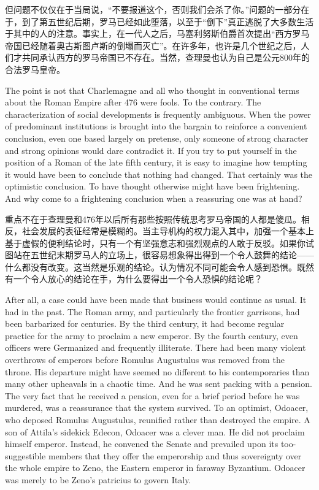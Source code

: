 \begin{Parallel}{97mm}{72mm}
  \ParallelRText
  {但问题不仅仅在于当局说，“不要报道这个，否则我们会杀了你。”问题的一部分在于，到了第五世纪后期，罗马已经如此堕落，以至于“倒下”真正逃脱了大多数生活于其中的人的注意。事实上，在一代人之后，马塞利努斯伯爵首次提出“西方罗马帝国已经随着奥古斯图卢斯的倒塌而灭亡”。在许多年，也许是几个世纪之后，人们才共同承认西方的罗马帝国已不存在。当然，查理曼也认为自己是公元800年的合法罗马皇帝。}
  \ParallelPar


  \ParallelLText
  {The point is not that Charlemagne and all who thought in conventional terms about the Roman Empire after 476 were fools. To the contrary. The characterization of social developments is frequently ambiguous. When the power of predominant institutions is brought into the bargain to reinforce a convenient conclusion, even one based largely on pretense, only someone of strong character and strong opinions would dare contradict it. If you try to put yourself in the position of a Roman of the late fifth century, it is easy to imagine how tempting it would have been to conclude that nothing had changed. That certainly was the optimistic conclusion. To have thought otherwise might have been frightening. And why come to a frightening conclusion when a reassuring one was at hand?}
  
  \ParallelRText
  {重点不在于查理曼和476年以后所有那些按照传统思考罗马帝国的人都是傻瓜。相反，社会发展的表征经常是模糊的。当主导机构的权力混入其中，加强一个基本上基于虚假的便利结论时，只有一个有坚强意志和强烈观点的人敢于反驳。如果你试图站在五世纪末期罗马人的立场上，很容易想象得出得到一个令人鼓舞的结论——什么都没有改变。这当然是乐观的结论。认为情况不同可能会令人感到恐惧。既然有一个令人放心的结论在手，为什么要得出一个令人恐惧的结论呢？}
  \ParallelPar


  \ParallelLText
  {After all, a case could have been made that business would continue as usual. It had in the past. The Roman army, and particularly the frontier garrisons, had been barbarized for centuries. By the third century, it had become regular practice for the army to proclaim a new emperor. By the fourth century, even officers were Germanized and frequently illiterate. There had been many violent overthrows of emperors before Romulus Augustulus was removed from the throne. His departure might have seemed no different to his contemporaries than many other upheavals in a chaotic time. And he was sent packing with a pension. The very fact that he received a pension, even for a brief period before he was murdered, was a reassurance that the system survived. To an optimist, Odoacer, who deposed Romulus Augustulus, reunified rather than destroyed the empire. A son of Attila's sidekick Edecon, Odoacer was a clever man. He did not proclaim himself emperor. Instead, he convened the Senate and prevailed upon its too-suggestible members that they offer the emperorship and thus sovereignty over the whole empire to Zeno, the Eastern emperor in faraway Byzantium. Odoacer was merely to be Zeno's patricius to govern Italy.}
  

\end{Parallel}
